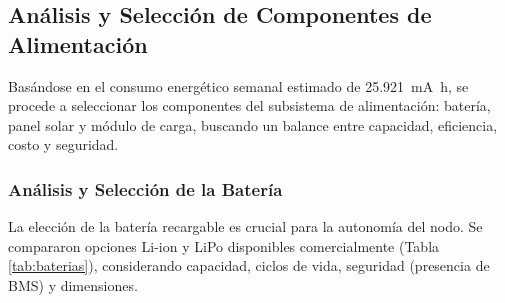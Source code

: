 \subsection{Análisis y Selección de Componentes de Alimentación}
\label{subsec:seleccion_hardware_alimentacion}

Basándose en el consumo energético semanal estimado de \SI{25.921}{\milli\ampere\hour}, se procede a seleccionar los componentes del subsistema de alimentación: batería, panel solar y módulo de carga, buscando un balance entre capacidad, eficiencia, costo y seguridad.

\subsubsection{Análisis y Selección de la Batería}
\label{subsubsec:analisis_y_seleccion_de_la_bateria}
La elección de la batería recargable es crucial para la autonomía del nodo. Se compararon opciones Li-ion y LiPo disponibles comercialmente (Tabla \ref{tab:baterias}), considerando capacidad, ciclos de vida, seguridad (presencia de BMS) y dimensiones.

